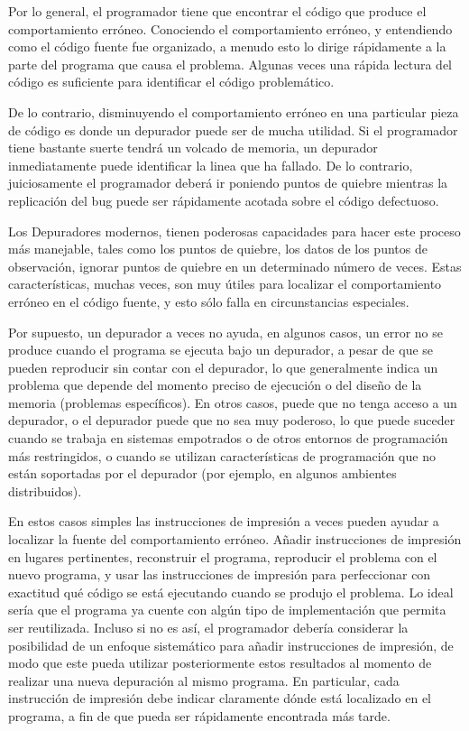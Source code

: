 \documentclass[12pt,legalpaper]{report}
\begin{document}
Por lo general, el programador tiene que encontrar el código que produce el comportamiento erróneo.  Conociendo el comportamiento erróneo, y entendiendo como el código fuente fue organizado, a menudo esto lo dirige rápidamente a la parte del programa que causa el problema.  Algunas veces una rápida lectura del código es suficiente para identificar el código problemático.

De lo contrario, disminuyendo el comportamiento erróneo en una particular pieza de código es donde un depurador puede ser de mucha utilidad.  Si el programador tiene bastante suerte tendrá un volcado de memoria, un depurador inmediatamente puede identificar la linea que ha fallado.  De lo contrario, juiciosamente el programador deberá ir poniendo puntos de quiebre mientras la replicación del bug puede ser rápidamente acotada sobre el código defectuoso.

Los Depuradores modernos, tienen poderosas capacidades para hacer este proceso más manejable, tales como los puntos de quiebre, los datos de los puntos de observación, ignorar puntos de quiebre en un determinado número de veces.  Estas características, muchas veces, son muy útiles para localizar el comportamiento erróneo en el código fuente, y esto sólo falla en circunstancias especiales.

Por supuesto, un depurador a veces no ayuda, en algunos casos, un error no se produce cuando el programa se ejecuta bajo un depurador, a pesar de que se pueden reproducir sin contar con el depurador, lo que generalmente indica un problema que depende del momento preciso de ejecución o del diseño de la memoria (problemas específicos). En otros casos, puede que no tenga acceso a un depurador, o el depurador puede que no sea muy poderoso, lo que puede suceder cuando se trabaja en sistemas empotrados o de otros entornos de programación más restringidos, o cuando se utilizan características de programación que no están soportadas por el depurador (por ejemplo, en algunos ambientes distribuidos).

En estos casos simples las instrucciones de impresión a veces pueden ayudar a localizar la fuente del comportamiento erróneo. Añadir instrucciones de impresión en lugares pertinentes, reconstruir el programa, reproducir el problema con el nuevo programa, y usar las instrucciones de impresión para perfeccionar con exactitud qué código se está ejecutando cuando se produjo el problema.  Lo ideal sería que el programa ya cuente con algún tipo de implementación que permita ser reutilizada. Incluso si no es así, el programador debería considerar la posibilidad de un enfoque sistemático para añadir instrucciones de impresión, de modo que este pueda utilizar posteriormente estos resultados al momento de realizar una nueva depuración al mismo programa. En particular, cada instrucción de impresión debe indicar claramente dónde está localizado en el programa, a fin de que pueda ser rápidamente encontrada más tarde.
\end{document}
